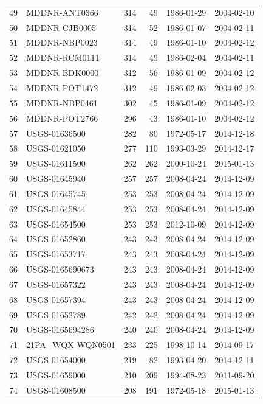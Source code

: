 \documentclass[a4paper,11pt]{article}\usepackage[]{graphicx}\usepackage[]{color}
\begin{document}
\begin{table}[ht]
\begin{tabular}{rlrrll}
  49 & MDDNR-ANT0366 & 314 &  49 & 1986-01-29 & 2004-02-10 \\ 
  50 & MDDNR-CJB0005 & 314 &  52 & 1986-01-07 & 2004-02-11 \\ 
  51 & MDDNR-NBP0023 & 314 &  49 & 1986-01-10 & 2004-02-12 \\ 
  52 & MDDNR-RCM0111 & 314 &  49 & 1986-02-04 & 2004-02-11 \\ 
  53 & MDDNR-BDK0000 & 312 &  56 & 1986-01-09 & 2004-02-12 \\ 
  54 & MDDNR-POT1472 & 312 &  49 & 1986-02-03 & 2004-02-12 \\ 
  55 & MDDNR-NBP0461 & 302 &  45 & 1986-01-09 & 2004-02-12 \\ 
  56 & MDDNR-POT2766 & 296 &  43 & 1986-01-10 & 2004-02-12 \\ 
  57 & USGS-01636500 & 282 &  80 & 1972-05-17 & 2014-12-18 \\ 
  58 & USGS-01621050 & 277 & 110 & 1993-03-29 & 2014-12-17 \\ 
  59 & USGS-01611500 & 262 & 262 & 2000-10-24 & 2015-01-13 \\ 
  60 & USGS-01645940 & 257 & 257 & 2008-04-24 & 2014-12-09 \\ 
  61 & USGS-01645745 & 253 & 253 & 2008-04-24 & 2014-12-09 \\ 
  62 & USGS-01645844 & 253 & 253 & 2008-04-24 & 2014-12-09 \\ 
  63 & USGS-01654500 & 253 & 253 & 2012-10-09 & 2014-12-09 \\ 
  64 & USGS-01652860 & 243 & 243 & 2008-04-24 & 2014-12-09 \\ 
  65 & USGS-01653717 & 243 & 243 & 2008-04-24 & 2014-12-09 \\ 
  66 & USGS-0165690673 & 243 & 243 & 2008-04-24 & 2014-12-09 \\ 
  67 & USGS-01657322 & 243 & 243 & 2008-04-24 & 2014-12-09 \\ 
  68 & USGS-01657394 & 243 & 243 & 2008-04-24 & 2014-12-09 \\ 
  69 & USGS-01652789 & 242 & 242 & 2008-04-24 & 2014-12-09 \\ 
  70 & USGS-0165694286 & 240 & 240 & 2008-04-24 & 2014-12-09 \\ 
  71 & 21PA\_WQX-WQN0501 & 233 & 225 & 1998-10-14 & 2014-09-17 \\ 
  72 & USGS-01654000 & 219 &  82 & 1993-04-20 & 2014-12-11 \\ 
  73 & USGS-01659000 & 210 & 209 & 1994-08-23 & 2011-09-20 \\ 
  74 & USGS-01608500 & 208 & 191 & 1972-05-18 & 2015-01-13 \\ 

\end{tabular}
\end{table}
\end{document}
